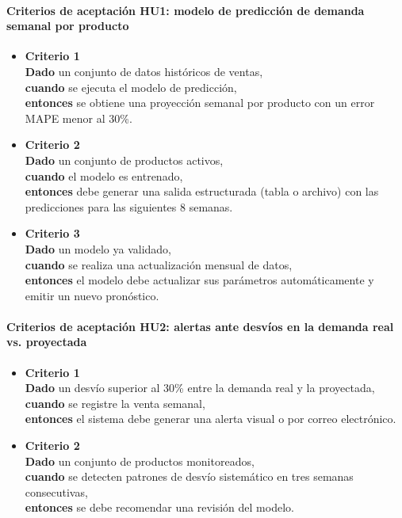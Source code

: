 \documentclass[
11pt, %
]{charter}
\begin{document}
\paragraph{Criterios de aceptación HU1: modelo de predicción de demanda semanal por producto}
\begin{itemize}
  \item \textbf{Criterio 1} \\
  \textbf{Dado} un conjunto de datos históricos de ventas, \\
  \textbf{cuando} se ejecuta el modelo de predicción, \\
  \textbf{entonces} se obtiene una proyección semanal por producto con un error MAPE menor al 30\%.

  \item \textbf{Criterio 2} \\
  \textbf{Dado} un conjunto de productos activos, \\
  \textbf{cuando} el modelo es entrenado, \\
  \textbf{entonces} debe generar una salida estructurada (tabla o archivo) con las predicciones para las siguientes 8 semanas.

  \item \textbf{Criterio 3} \\
  \textbf{Dado} un modelo ya validado, \\
  \textbf{cuando} se realiza una actualización mensual de datos, \\
  \textbf{entonces} el modelo debe actualizar sus parámetros automáticamente y emitir un nuevo pronóstico.
\end{itemize}

\vspace{1em}

\paragraph{Criterios de aceptación HU2: alertas ante desvíos en la demanda real vs. proyectada}
\begin{itemize}
  \item \textbf{Criterio 1} \\
  \textbf{Dado} un desvío superior al 30\% entre la demanda real y la proyectada, \\
  \textbf{cuando} se registre la venta semanal, \\
  \textbf{entonces} el sistema debe generar una alerta visual o por correo electrónico.

  \item \textbf{Criterio 2} \\
  \textbf{Dado} un conjunto de productos monitoreados, \\
  \textbf{cuando} se detecten patrones de desvío sistemático en tres semanas consecutivas, \\
  \textbf{entonces} se debe recomendar una revisión del modelo.
\end{itemize}
\end{document}
